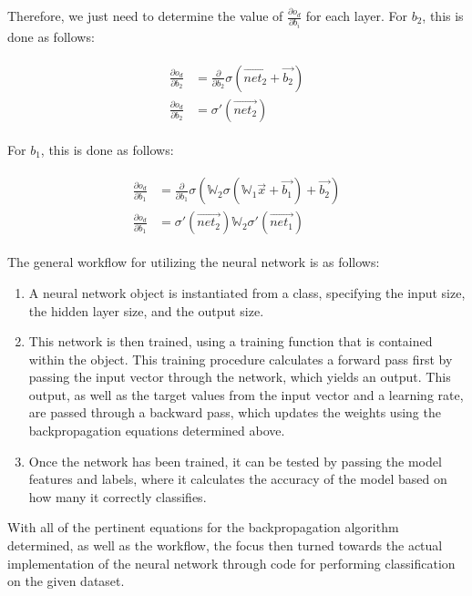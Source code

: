 \documentclass[a4paper]{article}
\begin{document}
Therefore, we just need to determine the value of $\frac{\partial{o_d}}{\partial{b_i}}$ for each layer. For $b_2$, this is done as follows:

\begin{gather}
    \begin{aligned}
        \frac{\partial{o_d}}{\partial{b_2}} &= \frac{\partial}{\partial{b_2}}\sigma(\overrightarrow{net_2} + \overrightarrow{b_2}) \\
        \frac{\partial{o_d}}{\partial{b_2}} &=\sigma'(\overrightarrow{net_2})
    \end{aligned}
\end{gather}

\newpage 
For $b_1$, this is done as follows:

\begin{gather}
    \begin{aligned}
        \frac{\partial{o_d}}{\partial{b_1}} &= \frac{\partial}{\partial{b_1}} \sigma(\mathbb W_2 \sigma(\mathbb W_1 \overrightarrow{x} + \overrightarrow{b_1}) + \overrightarrow{b_2})\\
        \frac{\partial{o_d}}{\partial{b_1}} &= \sigma'(\overrightarrow{net_2})\mathbb W_2 \sigma'(\overrightarrow{net_1})
    \end{aligned}
\end{gather}

The general workflow for utilizing the neural network is as follows:

\begin{enumerate}
    \item A neural network object is instantiated from a class, specifying the input size, the hidden layer size, and the output size.
    \item This network is then trained, using a training function that is contained within the object. This training procedure calculates a forward pass first by passing the input vector through the network, which yields an output. This output, as well as the target values from the input vector and a learning rate, are passed through a backward pass, which updates the weights using the backpropagation equations determined above.
    \item Once the network has been trained, it can be tested by passing the model features and labels, where it calculates the accuracy of the model based on how many it correctly classifies.
\end{enumerate}

With all of the pertinent equations for the backpropagation algorithm determined, as well as the workflow, the focus then turned towards the actual implementation of the neural network through code for performing classification on the given dataset.
\end{document}
